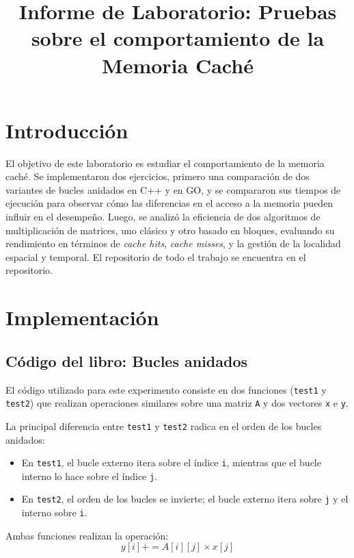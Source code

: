 \documentclass[conference]{IEEEtran}
\begin{document}
\title{Informe de Laboratorio: Pruebas sobre el comportamiento de la Memoria Caché}


\author{
}



\maketitle




\section{Introducción}
El objetivo de este laboratorio es estudiar el comportamiento de la memoria caché. Se implementaron dos ejercicios, 
primero una comparación de dos variantes de bucles anidados en C++ y en GO, y se compararon sus tiempos de ejecución para 
observar cómo las diferencias en el acceso a la memoria pueden influir en el desempeño. Luego, se analizó la
 eficiencia de dos algoritmos de multiplicación de matrices, uno clásico y otro basado en bloques, evaluando 
 su rendimiento en términos de \textit{cache hits}, \textit{cache misses},
 y la gestión de la localidad espacial y temporal. El repositorio de todo el trabajo se encuentra en el repositorio\cite{repo}.

\section{Implementación}
\subsection{\textbf{Código del libro: Bucles anidados}}

El código utilizado para este experimento consiste en dos funciones (\texttt{test1} y \texttt{test2})
que realizan operaciones similares sobre una matriz \texttt{A} y dos vectores \texttt{x} e \texttt{y}.


La principal diferencia entre \texttt{test1} y \texttt{test2} radica en el orden de los bucles anidados:
\begin{itemize}
    \item  En \texttt{test1}, el bucle externo itera sobre el índice \texttt{i}, mientras que el bucle interno lo hace sobre el índice \texttt{j}.
    \item  En \texttt{test2}, el orden de los bucles se invierte; el bucle externo itera sobre \texttt{j} y el interno sobre \texttt{i}.
\end{itemize}
Ambas funciones realizan la operación:
\[
    y[i] += A[i][j] \times x[j]
\]
\end{document}
